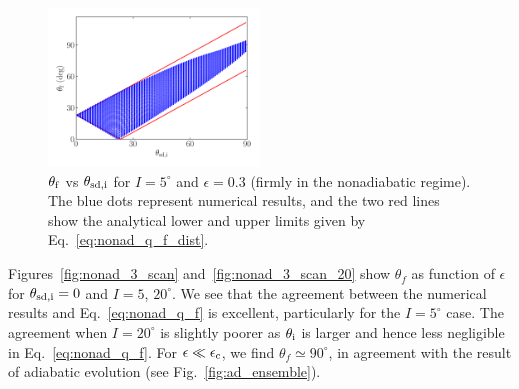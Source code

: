 \documentclass[
        fleqn,
        usenatbib,
    ]{mnras}
\begin{document}
\begin{figure}
    \centering
    \includegraphics[width=0.5\textwidth]{plots_diskdisp/3_ensemble_05_05.png}
    \caption{$\theta_{\rm  f}$ vs $\theta_{\rm sd, i}$ for $I=5^\circ$ and
    $\epsilon = 0.3$ (firmly in the nonadiabatic regime). The blue dots
    represent numerical results, and the two red lines show the analytical lower
    and upper limits given by
    Eq.~\eqref{eq:nonad_q_f_dist}.}\label{fig:nonad_3_ensemble}
\end{figure}

Figures~\ref{fig:nonad_3_scan} and~\ref{fig:nonad_3_scan_20} show $\theta_f$ as
function of $\epsilon$ for $\theta_{\rm sd,i} = 0$ and $I = 5$, $20^\circ$. We
see that the agreement between the numerical results and
Eq.~\eqref{eq:nonad_q_f} is excellent, particularly for the $I = 5^\circ$ case.
The agreement when $I = 20^\circ$ is slightly poorer as $\theta_{\rm i}$ is
larger and hence less negligible in Eq.~\eqref{eq:nonad_q_f}. For $\epsilon \ll
\epsilon_{\rm c}$, we find $\theta_f \simeq 90^\circ$, in agreement with the
result of adiabatic evolution (see Fig.~\ref{fig:ad_ensemble}).
\end{document}

